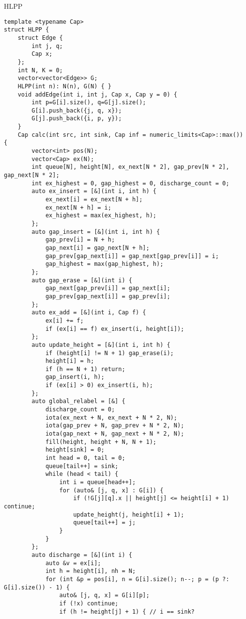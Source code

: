 \documentclass{ctexart}
\begin{document}
HLPP
\begin{lstlisting}
template <typename Cap>
struct HLPP {
    struct Edge {
        int j, q;
        Cap x;
    };
    int N, K = 0;
    vector<vector<Edge>> G;
    HLPP(int n): N(n), G(N) { }
    void addEdge(int i, int j, Cap x, Cap y = 0) {
        int p=G[i].size(), q=G[j].size();
        G[i].push_back({j, q, x});
        G[j].push_back({i, p, y});
    }
    Cap calc(int src, int sink, Cap inf = numeric_limits<Cap>::max()) {
        vector<int> pos(N);
        vector<Cap> ex(N);
        int queue[N], height[N], ex_next[N * 2], gap_prev[N * 2], gap_next[N * 2];
        int ex_highest = 0, gap_highest = 0, discharge_count = 0;
        auto ex_insert = [&](int i, int h) {
            ex_next[i] = ex_next[N + h];
            ex_next[N + h] = i;
            ex_highest = max(ex_highest, h);
        };
        auto gap_insert = [&](int i, int h) {
            gap_prev[i] = N + h;
            gap_next[i] = gap_next[N + h];
            gap_prev[gap_next[i]] = gap_next[gap_prev[i]] = i;
            gap_highest = max(gap_highest, h);
        };
        auto gap_erase = [&](int i) {
            gap_next[gap_prev[i]] = gap_next[i];
            gap_prev[gap_next[i]] = gap_prev[i];
        };
        auto ex_add = [&](int i, Cap f) {
            ex[i] += f;
            if (ex[i] == f) ex_insert(i, height[i]);
        };
        auto update_height = [&](int i, int h) {
            if (height[i] != N + 1) gap_erase(i);
            height[i] = h;
            if (h == N + 1) return;
            gap_insert(i, h);
            if (ex[i] > 0) ex_insert(i, h);
        };
        auto global_relabel = [&] {
            discharge_count = 0;
            iota(ex_next + N, ex_next + N * 2, N);
            iota(gap_prev + N, gap_prev + N * 2, N);
            iota(gap_next + N, gap_next + N * 2, N);
            fill(height, height + N, N + 1);
            height[sink] = 0;
            int head = 0, tail = 0;
            queue[tail++] = sink;
            while (head < tail) {
                int i = queue[head++];
                for (auto& [j, q, x] : G[i]) {
                    if (!G[j][q].x || height[j] <= height[i] + 1) continue;
                    update_height(j, height[i] + 1);
                    queue[tail++] = j;
                }
            }
        };
        auto discharge = [&](int i) {
            auto &v = ex[i];
            int h = height[i], nh = N;
            for (int &p = pos[i], n = G[i].size(); n--; p = (p ?: G[i].size()) - 1) {
                auto& [j, q, x] = G[i][p];
                if (!x) continue;
                if (h != height[j] + 1) { // i == sink?

\end{lstlisting}
\end{document}
